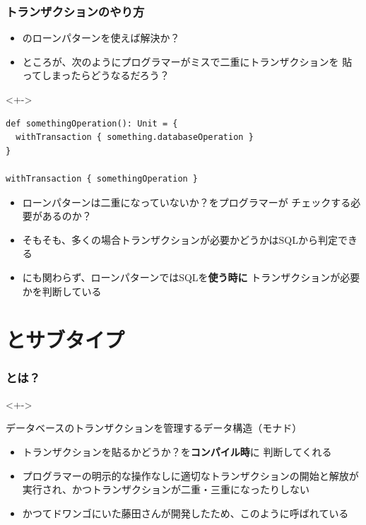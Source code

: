 \begin{frame}[fragile]
  \frametitle{トランザクションのやり方}

  \begin{itemize}
    \item<+-> のローンパターンを使えば解決か？
    \item<+-> ところが、次のようにプログラマーがミスで二重にトランザクションを
    貼ってしまったらどうなるだろう？    
  \end{itemize}

  \begin{uncoverenv}<+->
\begin{lstlisting}[style=scala]
def somethingOperation(): Unit = {
  withTransaction { something.databaseOperation }
}
    
withTransaction { somethingOperation }
\end{lstlisting}
  \end{uncoverenv}

  \begin{itemize}
    \item<+-> ローンパターンは二重になっていないか？をプログラマーが
    チェックする必要があるのか？
    
    \item<+-> そもそも、多くの場合トランザクションが必要かどうかはSQLから判定できる
    
    \item<+-> にも関わらず、ローンパターンではSQLを\textbf{使う時に}
    トランザクションが必要かを判断している
  \end{itemize}
\end{frame}

\section{\protect\Fujitask とサブタイプ}

\begin{frame}
  \frametitle{\Fujitask とは？}

  \pause
  \begin{uncoverenv}<+->
    \begin{block}{\Fujitask}
      データベースのトランザクションを管理するデータ構造（モナド）
    \end{block}
  \end{uncoverenv}

  \begin{itemize}
    \item<+-> トランザクションを貼るかどうか？を\textbf{コンパイル時}に
    判断してくれる

    \item<+-> プログラマーの明示的な操作なしに適切なトランザクションの開始と解放が
    実行され、かつトランザクションが二重・三重になったりしない

    \item<+-> かつてドワンゴにいた藤田さんが開発したため、このように呼ばれている
  \end{itemize}
\end{frame}

